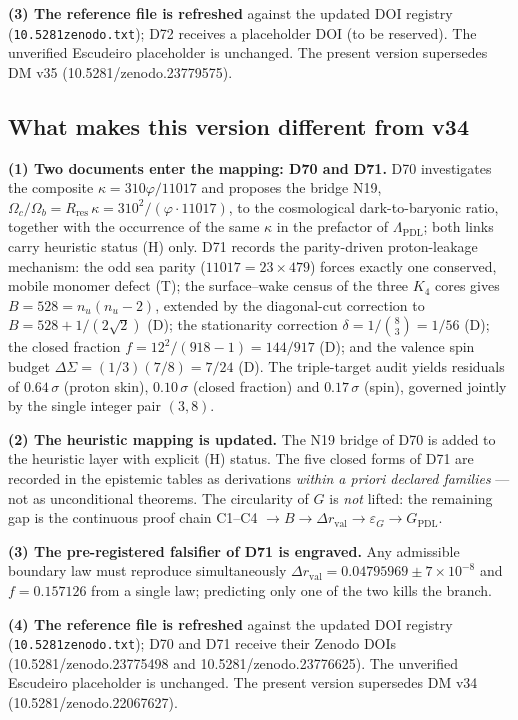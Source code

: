 \documentclass[11pt,a4paper]{article}
\theoremstyle{plain}
\theoremstyle{definition}
\theoremstyle{remark}
\begin{document}
\textbf{(3) The reference file is refreshed} against the updated DOI registry (\texttt{10.5281zenodo.txt}); D72 receives a placeholder DOI (to be reserved). The unverified Escudeiro placeholder is unchanged. The present version supersedes DM v35 (10.5281/zenodo.23779575).

\subsection{What makes this version different from v34}

\textbf{(1) Two documents enter the mapping: D70 and D71.} D70 investigates the composite $\kappa=310\varphi/11017$ and proposes the bridge N19, $\Omega_{c}/\Omega_{b}=R_{\mathrm{res}}\,\kappa=310^{2}/(\varphi\cdot11017)$, to the cosmological dark-to-baryonic ratio, together with the occurrence of the same $\kappa$ in the prefactor of $\Lambda_{\mathrm{PDL}}$; both links carry heuristic status (H) only. D71 records the parity-driven proton-leakage mechanism: the odd sea parity ($11017=23\times479$) forces exactly one conserved, mobile monomer defect (T); the surface--wake census of the three $K_{4}$ cores gives $B=528=n_{u}(n_{u}-2)$, extended by the diagonal-cut correction to $B=528+1/(2\sqrt{2})$ (D); the stationarity correction $\delta=1/\binom{8}{3}=1/56$ (D); the closed fraction $f=12^{2}/(918-1)=144/917$ (D); and the valence spin budget $\Delta\Sigma=(1/3)(7/8)=7/24$ (D). The triple-target audit yields residuals of $0.64\,\sigma$ (proton skin), $0.10\,\sigma$ (closed fraction) and $0.17\,\sigma$ (spin), governed jointly by the single integer pair $(3,8)$.

\textbf{(2) The heuristic mapping is updated.} The N19 bridge of D70 is added to the heuristic layer with explicit (H) status. The five closed forms of D71 are recorded in the epistemic tables as derivations \emph{within a priori declared families} --- not as unconditional theorems. \textcolor{negativered}{The circularity of $G$ is \emph{not} lifted}: the remaining gap is the continuous proof chain C1--C4 $\to B\to\Delta r_{\mathrm{val}}\to\varepsilon_{G}\to G_{\mathrm{PDL}}$.

\textbf{(3) The pre-registered falsifier of D71 is engraved.} Any admissible boundary law must reproduce simultaneously $\Delta r_{\mathrm{val}}=0.04795969\pm7\times10^{-8}$ and $f=0.157126$ from a single law; predicting only one of the two kills the branch.

\textbf{(4) The reference file is refreshed} against the updated DOI registry (\texttt{10.5281zenodo.txt}); D70 and D71 receive their Zenodo DOIs (10.5281/zenodo.23775498 and 10.5281/zenodo.23776625). The unverified Escudeiro placeholder is unchanged. The present version supersedes DM v34 (10.5281/zenodo.22067627).
\end{document}
